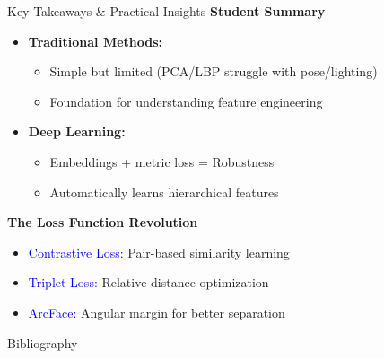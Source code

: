 \documentclass[pdfpagelabels=false, usepdftitle=false, aspectratio=169]{beamer}
\begin{document}
\begin{frame}{Key Takeaways \& Practical Insights}
    \textbf{Student Summary}
    \begin{itemize}
        \item \textbf{Traditional Methods:} 
        \begin{itemize}
            \item Simple but limited (PCA/LBP struggle with pose/lighting)
            \item Foundation for understanding feature engineering
        \end{itemize}
        \item \textbf{Deep Learning:} 
        \begin{itemize}
            \item Embeddings + metric loss = Robustness
            \item Automatically learns hierarchical features
        \end{itemize}
    \end{itemize}

    \textbf{The Loss Function Revolution}
    \begin{itemize}
        \item \textcolor{blue}{Contrastive Loss:} Pair-based similarity learning
        \item \textcolor{blue}{Triplet Loss:} Relative distance optimization
        \item \textcolor{blue}{ArcFace:} Angular margin for better separation
    \end{itemize}

    
\end{frame}

\begin{frame}{Bibliography}
\tiny 

% 

\end{frame}
\end{document}
